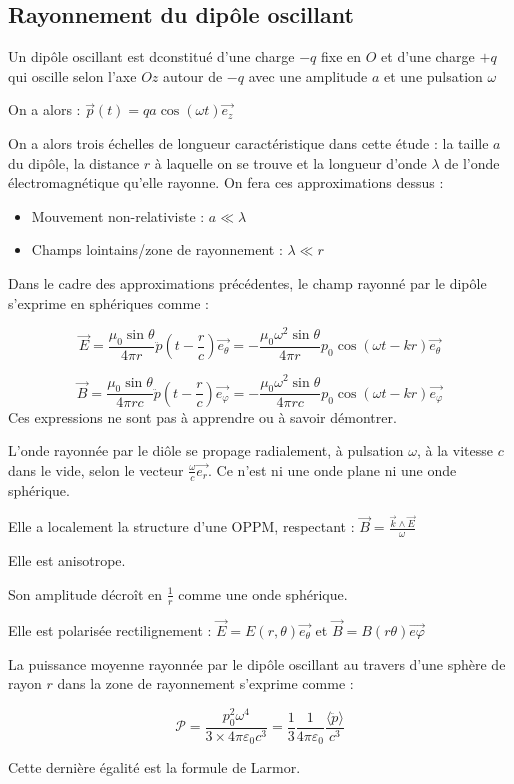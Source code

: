 \documentclass[a4paper,12pt]{book}
\newcommand{\Def}[2]{\begin{tcolorbox}[colback=white,colframe=red!10!green!20!blue!75!, title=Définition : #1]#2\end{tcolorbox}}
\newcommand{\Thr}[2]{\begin{tcolorbox}[sharp corners, colback=white,colframe=red!10!blue!30!green!75!, title=Théorème : #1]#2\end{tcolorbox}}
\renewcommand{\Vec}[1]{\overrightarrow{#1}}
\begin{document}
\subsection{Rayonnement du dipôle oscillant}
\Def{Dipôle oscillant}{Un dipôle oscillant est dconstitué d'une charge $-q$ fixe en $O$ et d'une charge $+q$ qui oscille selon l'axe $Oz$ autour de $-q$ avec une amplitude $a$ et une pulsation $\omega$
\par On a alors : $\Vec{p}(t) = qa\cos(\omega t)\Vec{e_z}$
\par On a alors trois échelles de longueur caractéristique dans cette étude : la taille $a$ du dipôle, la distance $r$ à laquelle on se trouve et la longueur d'onde $\lambda$ de l'onde électromagnétique qu'elle rayonne. On fera ces approximations dessus :\begin{itemize}
\item Mouvement non-relativiste : $a\ll\lambda$
\item Champs lointains/zone de rayonnement : $\lambda\ll r$
\end{itemize}}
\Thr{Expressions}{Dans le cadre des approximations précédentes, le champ rayonné par le dipôle s'exprime en sphériques comme :
\par $$\Vec{E} = \frac{\mu_0\sin\theta}{4\pi r}\ddot{p}\left(t-\frac{r}{c}\right)\Vec{e_\theta}=-\frac{\mu_0\omega^2\sin\theta}{4\pi r}p_0\cos(\omega t-kr)\Vec{e_\theta}$$
\par $$\Vec{B} = \frac{\mu_0\sin\theta}{4\pi rc}\ddot{p}\left(t-\frac{r}{c}\right)\Vec{e_\varphi}=-\frac{\mu_0\omega^2\sin\theta}{4\pi rc}p_0\cos(\omega t-kr)\Vec{e_\varphi}$$
Ces expressions ne sont pas à apprendre ou à savoir démontrer.
\par L'onde rayonnée par le diôle se propage radialement, à pulsation $\omega$, à la vitesse $c$ dans le vide, selon le vecteur $\frac{\omega}{c}\Vec{e_r}$. Ce n'est ni une onde plane ni une onde sphérique.
\par Elle a localement la structure d'une OPPM, respectant : $\Vec{B} =\frac{\Vec{k}\wedge\Vec{E}}{\omega}$
\par Elle est anisotrope.
\par Son amplitude décroît en $\frac{1}{r}$ comme une onde sphérique.
\par Elle est polarisée rectilignement : $\Vec{E}=E(r,\theta)\Vec{e_\theta}$ et $\Vec{B} = B(r\theta)\Vec{e\varphi}$}
\Thr{Thr}{La puissance moyenne rayonnée par le dipôle oscillant au travers d'une sphère de rayon $r$ dans la zone de rayonnement s'exprime comme :
\par $$\mathcal{P} =\frac{p_0^2\omega^4}{3\times 4\pi\varepsilon_0c^3} = \frac{1}{3}\frac{1}{4\pi\varepsilon_0}\dfrac{\langle\ddot{p}\rangle}{c^3}$$
\par Cette dernière égalité est la formule de Larmor.}
\end{document}
